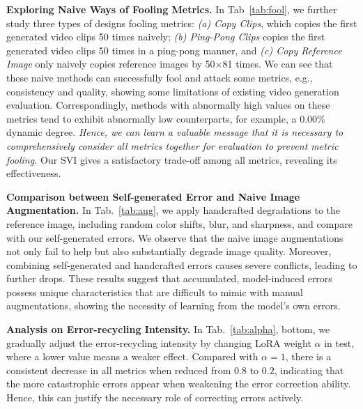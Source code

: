 \documentclass{article} %
\begin{document}
\textbf{Exploring Naive Ways of Fooling Metrics.} In Tab~\ref{tab:fool}, we further study three types of designs fooling metrics: \emph{(a) Copy Clips}, which copies the first generated video clips 50 times naively; \emph{(b) Ping-Pong Clips} copies the first generated video clips 50 times in a ping-pong manner, and \emph{(c) Copy Reference Image} only naively copies reference images by 50$\times$81 times. We can see that these naive methods can successfully fool and attack some metrics, e.g., consistency and quality, showing some limitations of existing video generation evaluation. Correspondingly, methods with abnormally high values on these metrics tend to exhibit abnormally low counterparts, for example, a 0.00\% dynamic degree. \emph{Hence, we can learn a valuable message that it is necessary to comprehensively consider all metrics together for evaluation to prevent metric fooling.} Our SVI gives a satisfactory trade-off among all metrics, revealing its effectiveness.

\textbf{Comparison between Self-generated Error and Naive Image Augmentation.} In Tab.~\ref{tab:aug}, we apply handcrafted degradations to the reference image, including random color shifts, blur, and sharpness, and compare with our self-generated errors. We observe that the naive image augmentations not only fail to help but also substantially degrade image quality. Moreover, combining self-generated and handcrafted errors causes severe conflicts, leading to further drops. These results suggest that accumulated, model-induced errors possess unique characteristics that are difficult to mimic with manual augmentations, showing the necessity of learning from the model’s own errors.


\textbf{Analysis on Error-recycling Intensity.} In Tab.~\ref{tab:alpha}, bottom, we gradually adjust the error-recycling intensity by changing LoRA weight $\alpha$ in test, where a lower value means a weaker effect. Compared with $\alpha=1$, there is a consistent decrease in all metrics when reduced from $0.8$ to $0.2$, indicating that the more catastrophic errors appear when weakening the error correction ability. Hence, this can justify the necessary role of correcting errors actively. 
\end{document}
